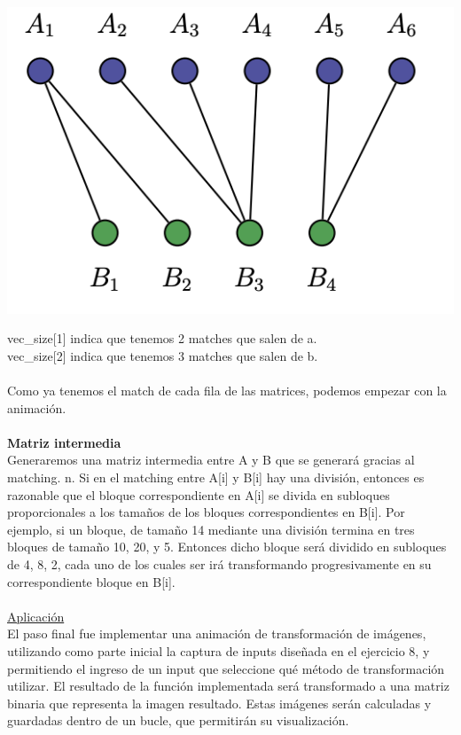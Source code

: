 \documentclass{article}
\begin{document}
		\begin{center}
			\includegraphics[scale=0.7]{a.png}
		\end{center}
		vec\_size[1] indica que tenemos 2 matches que salen de a.\\
		vec\_size[2] indica que tenemos 3 matches que salen de b.\\\\
		Como ya tenemos el match de cada fila de las matrices, podemos empezar con la animación. \\\\
		\textbf{Matriz intermedia}\\
		Generaremos una matriz intermedia entre A y B que se generará gracias al matching. 
		n. Si en el matching entre A[i] y B[i] hay una división, entonces es razonable que el bloque correspondiente en A[i] se divida en subloques proporcionales a los tamaños de los bloques correspondientes en B[i]. Por ejemplo, si un bloque, de tamaño 14 mediante una división termina en tres bloques de tamaño 10, 20, y 5. Entonces dicho bloque será dividido en subloques de 4, 8, 2, cada uno de los cuales ser irá transformando progresivamente en su correspondiente bloque en B[i].
		\\\\
		\underline{Aplicación}\\ 
		El paso final fue implementar una animación de transformación de imágenes, utilizando como parte inicial la captura de inputs diseñada en el ejercicio 8, y permitiendo el ingreso de un input que seleccione qué método de transformación utilizar. El resultado de la función implementada será transformado a una matriz binaria que representa la imagen resultado. Estas imágenes serán calculadas y guardadas dentro de un bucle, que permitirán su visualización.\\\\
\end{document}

